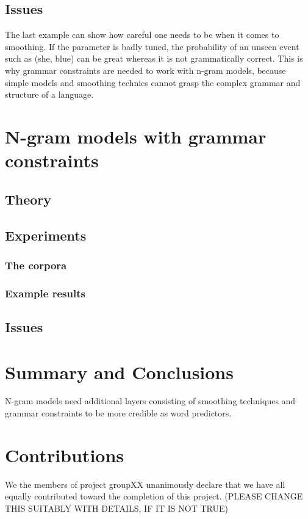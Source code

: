 \documentclass[a4paper,12pt]{article}
\begin{document}
\subsection{Issues}
	The last example can show how careful one needs to be when it comes to smoothing. If the parameter is badly tuned, the probability of an unseen event such as (she, blue) can be great whereas it is not grammatically correct. This is why grammar constraints are needed to work with n-gram models, because simple models and smoothing technics cannot grasp the complex grammar and structure of a language.


\section{N-gram models with grammar constraints}
\label{sec:ngramgrammar}

\subsection{Theory}
\subsection{Experiments}
\subsubsection{The corpora}
\subsubsection{Example results}
\subsection{Issues}

\section{Summary and Conclusions}
\label{sec:summary}

N-gram models need additional layers consisting of smoothing techniques and grammar constraints to be more credible as  word predictors.


\section{Contributions}
\label{sec:contributions}
We the members of project groupXX unanimously declare that 
we have all equally contributed toward the completion of this
project. (PLEASE CHANGE THIS SUITABLY WITH DETAILS, IF IT IS NOT TRUE)






\end{document}

